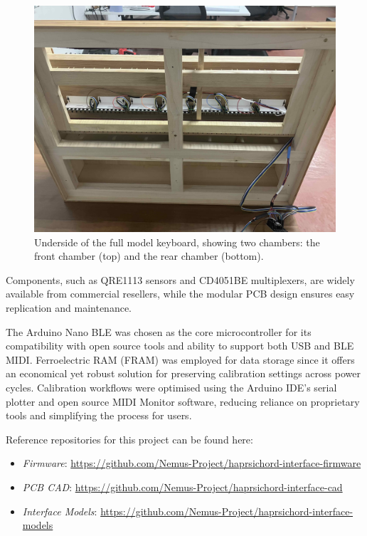 \begin{figure}[t]
  \centering
  \includegraphics[width=\linewidth]{src/images/49-key-bottom-sensors-no-keys.jpg} 
  \caption{Underside of the full model keyboard, showing two chambers: the front chamber (top) and the rear chamber (bottom).} 
  \Description{} 
  \label{fig:49-key-bottom}
\end{figure}

Components, such as QRE1113 sensors and CD4051BE multiplexers, are widely available from commercial resellers, while the modular PCB design ensures easy replication and maintenance.

The Arduino Nano BLE was chosen as the core microcontroller for its compatibility with open source tools and ability to support both USB and BLE MIDI. Ferroelectric RAM (FRAM) was employed for data storage since it offers an economical yet robust solution for preserving calibration settings across power cycles. Calibration workflows were optimised using the Arduino IDE’s serial plotter and open source MIDI Monitor software, reducing reliance on proprietary tools and simplifying the process for users. 

Reference repositories for this project can be found here:
\begin{anonsuppress}
    \begin{itemize}
        \item 
        \emph{Firmware}: \url{https://github.com/Nemus-Project/haprsichord-interface-firmware}
        \item 
        \emph{PCB CAD}: \url{https://github.com/Nemus-Project/haprsichord-interface-cad}
        \item 
        \emph{Interface Models}: \url{https://github.com/Nemus-Project/haprsichord-interface-models}
    \end{itemize}
\end{anonsuppress}



